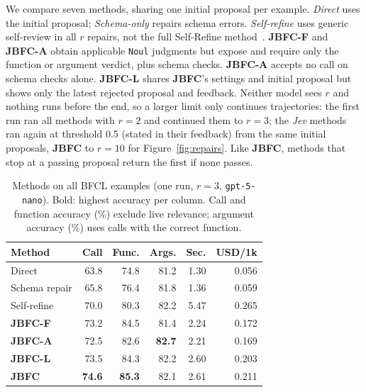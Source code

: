 \documentclass[10pt,twocolumn,letterpaper]{article}
\begin{document}
We compare seven methods, sharing one initial proposal per example. \emph{Direct} uses the initial proposal; \emph{Schema-only} repairs schema errors. \emph{Self-refine} uses generic self-review in all $r$ repairs, not the full Self-Refine method~\cite{madaan2023selfrefine}. \textbf{JBFC-F} and \textbf{JBFC-A} obtain applicable \texttt{Noul} judgments but expose and require only the function or argument verdict, plus schema checks. \textbf{JBFC-A} accepts no call on schema checks alone. \textbf{JBFC-L} shares \textbf{JBFC}'s settings and initial proposal but shows only the latest rejected proposal and feedback. Neither model sees $r$ and nothing runs before the end, so a larger limit only continues trajectories: the first run ran all methods with $r=2$ and continued them to $r=3$; the \textit{Jev} methods ran again at threshold 0.5 (stated in their feedback) from the same initial proposals, \textbf{JBFC} to $r=10$ for Figure~\ref{fig:repairs}. Like \textbf{JBFC}, methods that stop at a passing proposal return the first if none passes.

\begin{table}[t]
\centering\small
\setlength{\tabcolsep}{2.7pt}
\begin{tabular}{lrrrrr}
\toprule
Method & Call & Func. & Args. & Sec. & USD/1k \\
\midrule
Direct & 63.8 & 74.8 & 81.2 & 1.30 & 0.056 \\
Schema repair & 65.8 & 76.4 & 81.8 & 1.36 & 0.059 \\
Self-refine & 70.0 & 80.3 & 82.2 & 5.47 & 0.265 \\
\textbf{JBFC-F} & 73.2 & 84.5 & 81.4 & 2.24 & 0.172 \\
\textbf{JBFC-A} & 72.5 & 82.6 & \textbf{82.7} & 2.21 & 0.169 \\
\textbf{JBFC-L} & 73.5 & 84.3 & 82.2 & 2.60 & 0.203 \\
\textbf{JBFC} & \textbf{74.6} & \textbf{85.3} & 82.1 & 2.61 & 0.211 \\
\bottomrule
\end{tabular}
\caption{Methods on all BFCL examples (one run, $r=3$, \texttt{gpt-5-nano}). Bold: highest accuracy per column. Call and function accuracy (\%) exclude live relevance; argument accuracy (\%) uses calls with the correct function.}
\label{tab:main}
\end{table}
\end{document}
